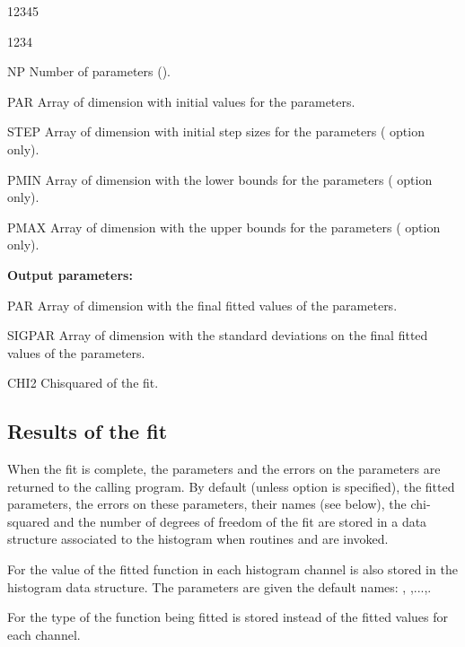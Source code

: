 \begin{DLtt}{12345}
\begin{DLtt}{1234}
\end{DLtt}
\item[NP] Number of parameters ().
\item[PAR] Array of dimension  with initial values for
      the parameters.
\item[STEP] Array of dimension  with initial step sizes
      for the parameters ( option only).
\item[PMIN] Array of dimension  with the lower bounds
      for the parameters ( option only).
\item[PMAX] Array of dimension  with the upper bounds
      for the parameters ( option only).
\item[{\rm\bf Output parameters:}]
\item[PAR] Array of dimension  with the final fitted values
      of the parameters.
\item[SIGPAR] Array of dimension  with the standard deviations
      on the final fitted values of the parameters.
\item[CHI2] Chisquared of the fit.
\end{DLtt}
 


\subsection{Results of the fit}
\label{sec:resultfit}

When the fit is complete, the parameters and the errors on the
parameters are returned to the calling program.
By default (unless option  is specified),
the fitted parameters, the errors on these parameters,
their names (see below),
the chi-squared and the number of degrees of freedom of the fit
are stored in a data structure associated to the histogram 
when routines  and  are invoked.

\begin{UL}
\item For  the value of the fitted function
      in each histogram channel is also stored in the histogram
      data structure.
      The parameters are given the default names:
      , ,...,.
\item For  the type of the function being fitted
      is stored instead of the fitted values for each channel.
\end{UL}

